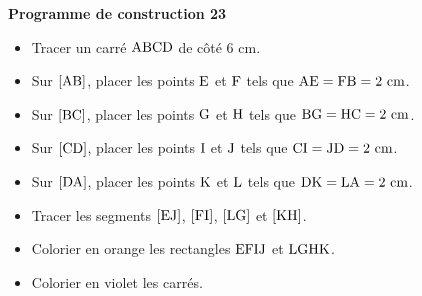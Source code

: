 \documentclass[exercice,a4]{thedocument}%
\begin{document}
%
\noindent\textbf{Programme de construction 23}\par\smallskip\noindent
\begin{itemize}
    \item Tracer un carré $\text{ABCD}$ de côté $6\text{ cm}$.
    \item Sur $[\text{AB}]$, placer les points $\text{E}$ et
    $\text{F}$ tels que $\text{AE}=\text{FB}=2\text{ cm}$.
    \item Sur $[\text{BC}]$, placer les points $\text{G}$ et
    $\text{H}$ tels que $\text{BG}=\text{HC}=2\text{ cm}$.
    \item Sur $[\text{CD}]$, placer les points $\text{I}$ et
    $\text{J}$ tels que $\text{CI}=\text{JD}=2\text{ cm}$.
    \item Sur $[\text{DA}]$, placer les points $\text{K}$ et
    $\text{L}$ tels que $\text{DK}=\text{LA}=2\text{ cm}$.
    \item Tracer les segments $[\text{EJ}]$, $[\text{FI}]$,
    $[\text{LG}]$ et $[\text{KH}]$.
    \item Colorier en orange les rectangles $\text{EFIJ}$ et
    $\text{LGHK}$.
    \item Colorier en violet les carrés.
\end{itemize}
\end{document}
